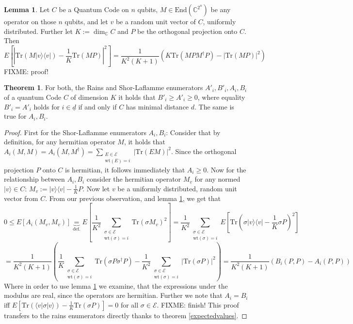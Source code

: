 \documentclass{article}
\def\E{\mathcal{E}}
\def\C{\mathbb{C}}
\def\End{\text{End}}
\def\Tr{\text{Tr}}
\def\wt{\text{wt}}
\theoremstyle{definition}
\newtheorem{theorem}[Satz]{Theorem}
\newtheorem{lem}[Satz]{Lemma}
\begin{document}
\begin{lem}\label{expvalvec}
Let $C$ be a Quantum Code on $n$ qubits, $M \in \End(\C^{2^n})$ be any operator on those $n$ qubits, and let $v$ be a random unit vector of $C$, uniformly distributed. Further let $K:= \dim_\C C$ and $P$ be the orthogonal projection onto $C$. Then
\begin{equation} E[|\Tr(M|v\rangle \langle v|) - \frac{1}{K}\Tr(MP)|^2] = \frac{1}{K^2(K+1)}(K \Tr(MPM^\dagger P) - |\Tr(MP)|^2) \end{equation}
FIXME: proof!
\end{lem}


\begin{theorem}
For both, the Rains and Shor-Laflamme enumerators $A'_i, B'_i, A_i, B_i$ of a quantum Code $C$ of dimension $K$ it holds that $B'_i \geq A'_i \geq 0$, where equality $B'_i = A'_i$  holds for $i \in \underline{d}$ if and only if $C$ has minimal distance $d$. The same is true for $A_i, B_i$.
\begin{proof}
First for the Shor-Laflamme enumerators $A_i, B_i$: Consider that by definition, for any hermitian operator $M$, it holds that $A_i(M,M) = A_i(M,M^\dagger) = \sum_{\substack{E \in \mathcal{E} \\ \wt(E) = i}} |\Tr(EM)|^2$. Since the orthogonal projection $P$ onto $C$ is hermitian,
it follows immediately that $A_i \geq 0$. Now for the relationship between $A_i,B_i$ consider the hermitian operator $M_v$ for any normed $|v \rangle \in C$: $M_v:= |v\rangle \langle v| - \frac{1}{K}P$. Now let $v$ be a uniformly distributed, random unit vector from $C$.
From our previous observation, and lemma \ref{expvalvec}, we get that
\begin{equation} 0 \leq E[A_i(M_v,M_v)] \underbrace{=}_{\text{def.}} E[\frac{1}{K^2} \sum_{\substack{\sigma \in \mathcal{E} \\ \wt(\sigma) = i}} \Tr(\sigma M_v)^2] = \frac{1}{K^2}  \sum_{\substack{\sigma \in \mathcal{E} \\ \wt(\sigma) = i}} E[\Tr(\sigma |v\rangle \langle v| - \frac{1}{K} \sigma P)^2] \end{equation}
\begin{equation} = \frac{1}{K^2(K+1)}(\frac{1}{K} \sum_{\substack{\sigma \in \mathcal{E} \\ \wt(\sigma) = i}}  \Tr(\sigma P \sigma^\dagger P) - \frac{1}{K^2}\sum_{\substack{\sigma \in \mathcal{E} \\ \wt(\sigma) = i}} |\Tr(\sigma P)|^2) = \frac{1}{K^2(K+1)} (B_i(P,P) - A_i(P,P)) \end{equation}
Where in order to use lemma \ref{expvalvec} we examine, that the expressions under the modulus are real, since the operators are hermitian. Further we note that $A_i = B_i$ iff $E[\Tr (\langle v | \sigma |v \rangle) - \frac{1}{K} \Tr(\sigma P)] = 0$ for all $\sigma \in \E$.
FIXME: finish!
This proof transfers to the rains enumerators directly thanks to theorem \ref{expectedvalues}.

\end{proof}

\end{theorem}
\end{document}
